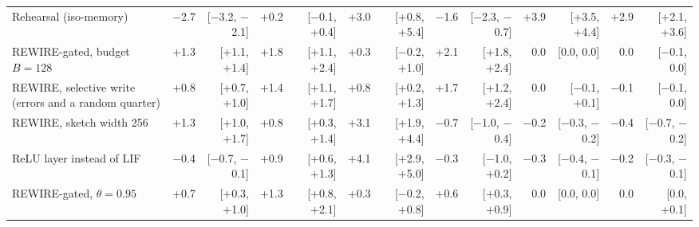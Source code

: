 \begin{tabular*}{\textheight}{@{\extracolsep{\fill}}lrrrrrrrrrrrr@{}}
Rehearsal (iso-memory) & \ensuremath{-}2.7 & [\ensuremath{-}3.2, \ensuremath{-}2.1] & +0.2 & [\ensuremath{-}0.1, +0.4] & +3.0 & [+0.8, +5.4] & \ensuremath{-}1.6 & [\ensuremath{-}2.3, \ensuremath{-}0.7] & +3.9 & [+3.5, +4.4] & +2.9 & [+2.1, +3.6] \\
REWIRE-gated, budget $B=128$ & +1.3 & [+1.1, +1.4] & +1.8 & [+1.1, +2.4] & +0.3 & [\ensuremath{-}0.2, +1.0] & +2.1 & [+1.8, +2.4] & 0.0 & [0.0, 0.0] & 0.0 & [\ensuremath{-}0.1, 0.0] \\
REWIRE, selective write (errors and a random quarter) & +0.8 & [+0.7, +1.0] & +1.4 & [+1.1, +1.7] & +0.8 & [+0.2, +1.3] & +1.7 & [+1.2, +2.4] & 0.0 & [\ensuremath{-}0.1, +0.1] & \ensuremath{-}0.1 & [\ensuremath{-}0.1, 0.0] \\
REWIRE, sketch width 256 & +1.3 & [+1.0, +1.7] & +0.8 & [+0.3, +1.4] & +3.1 & [+1.9, +4.4] & \ensuremath{-}0.7 & [\ensuremath{-}1.0, \ensuremath{-}0.4] & \ensuremath{-}0.2 & [\ensuremath{-}0.3, \ensuremath{-}0.2] & \ensuremath{-}0.4 & [\ensuremath{-}0.7, \ensuremath{-}0.2] \\
ReLU layer instead of LIF & \ensuremath{-}0.4 & [\ensuremath{-}0.7, \ensuremath{-}0.1] & +0.9 & [+0.6, +1.3] & +4.1 & [+2.9, +5.0] & \ensuremath{-}0.3 & [\ensuremath{-}1.0, +0.2] & \ensuremath{-}0.3 & [\ensuremath{-}0.4, \ensuremath{-}0.1] & \ensuremath{-}0.2 & [\ensuremath{-}0.3, \ensuremath{-}0.1] \\
REWIRE-gated, $\theta=0.95$ & +0.7 & [+0.3, +1.0] & +1.3 & [+0.8, +2.1] & +0.3 & [\ensuremath{-}0.2, +0.8] & +0.6 & [+0.3, +0.9] & 0.0 & [0.0, 0.0] & 0.0 & [0.0, +0.1] \\
\bottomrule
\end{tabular*}
